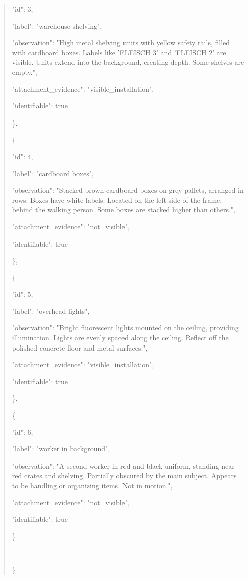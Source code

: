 \documentclass[10pt,a4paper]{article}
\begin{document}
\begin{quote}
      "id":\allowbreak{} 3,\allowbreak{}\par
      "label":\allowbreak{} "warehouse shelving",\allowbreak{}\par
      "observation":\allowbreak{} "High metal shelving units with yellow safety rails,\allowbreak{} filled with cardboard boxes. Labels like 'FLEISCH 3' and 'FLEISCH 2' are visible. Units extend into the background,\allowbreak{} creating depth. Some shelves are empty.",\allowbreak{}\par
      "attachment\_evidence":\allowbreak{} "visible\_installation",\allowbreak{}\par
      "identifiable":\allowbreak{} true\par
    \},\allowbreak{}\par
    \{\par
      "id":\allowbreak{} 4,\allowbreak{}\par
      "label":\allowbreak{} "cardboard boxes",\allowbreak{}\par
      "observation":\allowbreak{} "Stacked brown cardboard boxes on grey pallets,\allowbreak{} arranged in rows. Boxes have white labels. Located on the left side of the frame,\allowbreak{} behind the walking person. Some boxes are stacked higher than others.",\allowbreak{}\par
      "attachment\_evidence":\allowbreak{} "not\_visible",\allowbreak{}\par
      "identifiable":\allowbreak{} true\par
    \},\allowbreak{}\par
    \{\par
      "id":\allowbreak{} 5,\allowbreak{}\par
      "label":\allowbreak{} "overhead lights",\allowbreak{}\par
      "observation":\allowbreak{} "Bright fluorescent lights mounted on the ceiling,\allowbreak{} providing illumination. Lights are evenly spaced along the ceiling. Reflect off the polished concrete floor and metal surfaces.",\allowbreak{}\par
      "attachment\_evidence":\allowbreak{} "visible\_installation",\allowbreak{}\par
      "identifiable":\allowbreak{} true\par
    \},\allowbreak{}\par
    \{\par
      "id":\allowbreak{} 6,\allowbreak{}\par
      "label":\allowbreak{} "worker in background",\allowbreak{}\par
      "observation":\allowbreak{} "A second worker in red and black uniform,\allowbreak{} standing near red crates and shelving. Partially obscured by the main subject. Appears to be handling or organizing items. Not in motion.",\allowbreak{}\par
      "attachment\_evidence":\allowbreak{} "not\_visible",\allowbreak{}\par
      "identifiable":\allowbreak{} true\par
    \}\par
  ]\par
\}
\end{quote}
\end{document}
